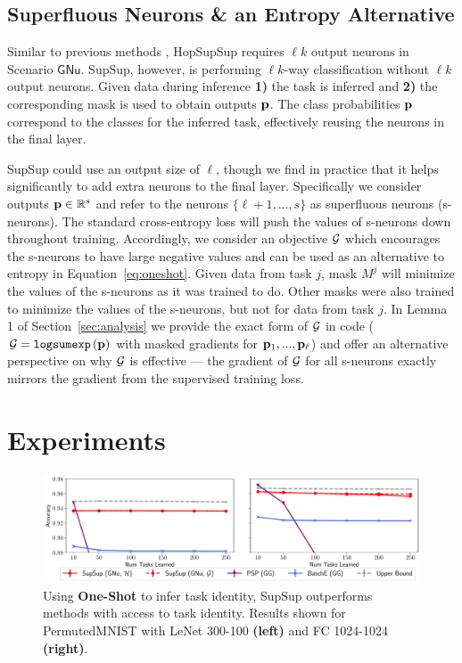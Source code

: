 \documentclass{article}
\newcommand{\ac}{SupSup\xspace}
\newcommand{\casename}[1]{\ensuremath{\mathsf{#1}}\xspace}
\begin{document}
\subsection{Superfluous Neurons \& an Entropy Alternative} \label{sec:s-neuron}
Similar to previous methods \cite{van2019three}, Hop\ac requires $\ell k$ output neurons in Scenario \casename{GNu}. \ac, however, is performing $\ell k$-way classification without $\ell k$ output neurons. Given data during inference \textbf{1)} the task is inferred and \textbf{2)} the corresponding mask is used to obtain outputs $\mathbf{p}$. The class probabilities $\mathbf{p}$ correspond to the classes for the inferred task, effectively reusing the neurons in the final layer. 

\ac could use an output size of $\ell$, though we find in practice that it helps significantly to add extra neurons to the final layer. Specifically we consider outputs $\mathbf{p} \in \mathbb{R}^{s}$ and refer to the neurons $\{\ell+1,...,s\}$ as superfluous neurons (s-neurons). The standard cross-entropy loss will push the values of s-neurons down throughout training. Accordingly, we consider an objective $\mathcal{G}$ which encourages the s-neurons to have large negative values and can be used as an alternative to entropy in Equation~\ref{eq:oneshot}. Given data from task $j$, mask $M^j$ will minimize the values of the s-neurons as it was trained to do. Other masks were also trained to minimize the values of the s-neurons, but not for data from task $j$. In Lemma 1 of Section~\ref{sec:analysis} we provide the exact form of $\mathcal{G}$ in code ($ \mathcal{G} = \texttt{logsumexp}\left( \mathbf{p} \right)$ with masked gradients for $\mathbf{p}_1,...,\mathbf{p}_\ell$) and offer an alternative perspective on why $\mathcal{G}$ is effective --- the gradient of $\mathcal{G}$ for all s-neurons exactly mirrors the gradient from the supervised training loss.

\section{Experiments} \label{sec:exps}
\begin{figure}[t]
    \centering
    \includegraphics[width=\textwidth]{figs/v1-v2.pdf}
    \caption{Using \textbf{One-Shot} to infer task identity, \ac outperforms methods with access to task identity. Results shown for PermutedMNIST with LeNet 300-100 \textbf{(left)} and FC 1024-1024 \textbf{(right)}.}
    \label{fig:v1-v2}
    \vspace{-.2em}
\end{figure}
\end{document}
